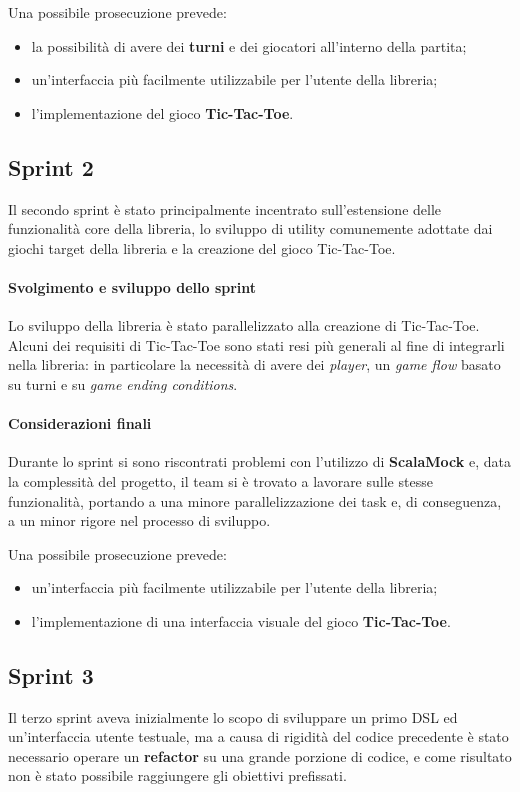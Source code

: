 Una possibile prosecuzione prevede:
\begin{itemize}
  \item la possibilità di avere dei \textbf{turni} e dei giocatori all'interno della partita;
  \item un'interfaccia più facilmente utilizzabile per l'utente della libreria;
  \item l'implementazione del gioco \textbf{Tic-Tac-Toe}.
\end{itemize}

\subsection{Sprint 2}
Il secondo sprint è stato principalmente incentrato sull'estensione delle funzionalità core della libreria, lo sviluppo di utility comunemente adottate dai giochi target della libreria e la creazione del gioco Tic-Tac-Toe.
\paragraph{Svolgimento e sviluppo dello sprint}
Lo sviluppo della libreria è stato parallelizzato alla creazione di Tic-Tac-Toe.
%
Alcuni dei requisiti di Tic-Tac-Toe sono stati resi più generali al fine di integrarli nella libreria: in particolare la necessità di avere dei \textit{player}, un \textit{game flow} basato su turni e su \textit{game ending conditions}.
\paragraph{Considerazioni finali}
Durante lo sprint si sono riscontrati problemi con l'utilizzo di \textbf{ScalaMock} e, data la complessità del progetto, il team si è trovato a lavorare sulle stesse funzionalità, portando a una minore parallelizzazione dei task e, di conseguenza, a un minor rigore nel processo di sviluppo.

Una possibile prosecuzione prevede:
\begin{itemize}
  \item un'interfaccia più facilmente utilizzabile per l'utente della libreria;
  \item l'implementazione di una interfaccia visuale del gioco \textbf{Tic-Tac-Toe}.
\end{itemize}

\subsection{Sprint 3}
Il terzo sprint aveva inizialmente lo scopo di sviluppare un primo DSL ed un'interfaccia utente testuale, ma a causa di rigidità del codice precedente è stato necessario operare un \textbf{refactor} su una grande porzione di codice, e come risultato non è stato possibile raggiungere gli obiettivi prefissati.

